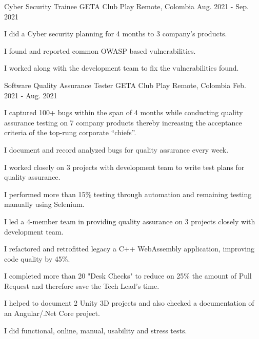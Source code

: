 \begin{cventries}
  \cventry
    {Cyber Security Trainee} %
    {GETA Club Play} %
    {Remote, Colombia} %
    {Aug. 2021 - Sep. 2021} %
    {
      \begin{cvitems} %
        \item {I did a Cyber security planning for 4 months to 3 company's products.}
        \item {I found and reported common OWASP based vulnerabilities.}
        \item {I worked along with the development team to fix the vulnerabilities found.}
      \end{cvitems}
    }

  \cventry
    {Software Quality Assurance Tester} %
    {GETA Club Play} %
    {Remote, Colombia} %
    {Feb. 2021 - Aug. 2021} %
    {
      \begin{cvitems} %
        \item {I captured 100+ bugs within the span of 4 months while conducting quality assurance testing on 7 company products thereby increasing the acceptance criteria of the top-rung corporate “chiefs”.}
        \item {I document and record analyzed bugs for quality assurance every week.}
        \item {I worked closely on 3 projects with development team to write test plans for quality assurance.}
        \item {I performed more than 15\% testing through automation and remaining testing manually using Selenium.}
        \item {I led a 4-member team in providing quality assurance on 3 projects closely with development team.}
        \item {I refactored and retrofitted legacy a C++ WebAssembly application, improving code quality by 45\%.}
        \item {I completed more than 20 "Desk Checks" to reduce on 25\% the amount of Pull Request and therefore save the Tech Lead's time.}
        \item {I helped to document 2 Unity 3D projects and also checked a documentation of an Angular/.Net Core project.}
        \item {I did functional, online, manual, usability and stress tests.}
      \end{cvitems}
    }
\end{cventries}
